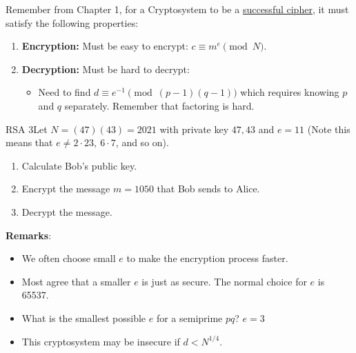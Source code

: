 Remember from Chapter 1, for a Cryptosystem to be a \hyperref[Successful Ciphers]{successful cipher}, it must satisfy the following properties:

\begin{enumerate}
    \item \textbf{Encryption:} Must be easy to encrypt: \(c \equiv m^e \pmod{N}\).
    \item \textbf{Decryption:} Must be hard to decrypt:
          \begin{itemize}
              \item Need to find \(d \equiv e^{-1}\pmod{(p-1)(q-1)}\) which requires knowing \(p\) and \(q\) separately. Remember that factoring is hard.
          \end{itemize}
\end{enumerate}

\begin{example}
    {RSA 3}Let \(N = (47)(43) = 2021\) with private key \(47,43\) and \(e = 11\) (Note this means that \(e \ne 2 \cdot 23, \ 6 \cdot 7\), and so on). \begin{enumerate}[label=(\alph*)]
        \item Calculate Bob's public key.
        \item Encrypt the message \(m = 1050\) that Bob sends to Alice.
        \item Decrypt the message.
    \end{enumerate}
\end{example}


\begin{center}
    \textbf{Remarks}:
\end{center}
\begin{itemize}
    \item We often choose small \(e\) to make the encryption process faster.
    \item Most agree that a smaller \(e\) is just as secure. The normal choice for \(e\) is 65537.
    \item What is the smallest possible \(e\) for a semiprime \(pq\)? \(e = 3\)
    \item This cryptosystem may be insecure if \(d < N^{1/4}\).
\end{itemize}


